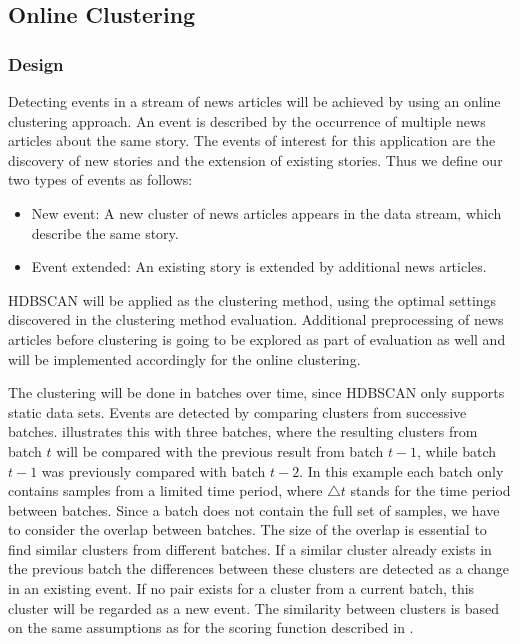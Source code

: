 \subsection{Online Clustering}
\label{subsec:4c_online_clustering}

\subsubsection{Design}
\label{subsubsec:4c_design}

Detecting events in a stream of news articles will be achieved by using an online clustering approach.
An event is described by the occurrence of multiple news articles about the same story.
The events of interest for this application are the discovery of new stories and the extension of existing stories.
Thus we define our two types of events as follows:

\begin{itemize}
    \item New event: A new cluster of news articles appears in the data stream, which describe the same story.
    \item Event extended: An existing story is extended by additional news articles.
\end{itemize}

HDBSCAN will be applied as the clustering method,
using the optimal settings discovered in the clustering method evaluation.
Additional preprocessing of news articles before clustering is going to be explored
as part of evaluation as well and will be implemented accordingly for the online clustering.

The clustering will be done in batches over time, since HDBSCAN only supports static data sets.
Events are detected by comparing clusters from successive batches.
 illustrates this with three batches,
where the resulting clusters from batch $t$ will be compared with the previous result from batch $t - 1$,
while batch $t - 1$ was previously compared with batch $t - 2$.
In this example each batch only contains samples from a limited time period,
where $\triangle t$ stands for the time period between batches.
Since a batch does not contain the full set of samples, we have to consider the overlap between batches.
The size of the overlap is essential to find similar clusters from different batches.
If a similar cluster already exists in the previous batch
the differences between these clusters are detected as a change in an existing event.
If no pair exists for a cluster from a current batch, this cluster will be regarded as a new event.
The similarity between clusters is based on the same assumptions
as for the scoring function described in .

